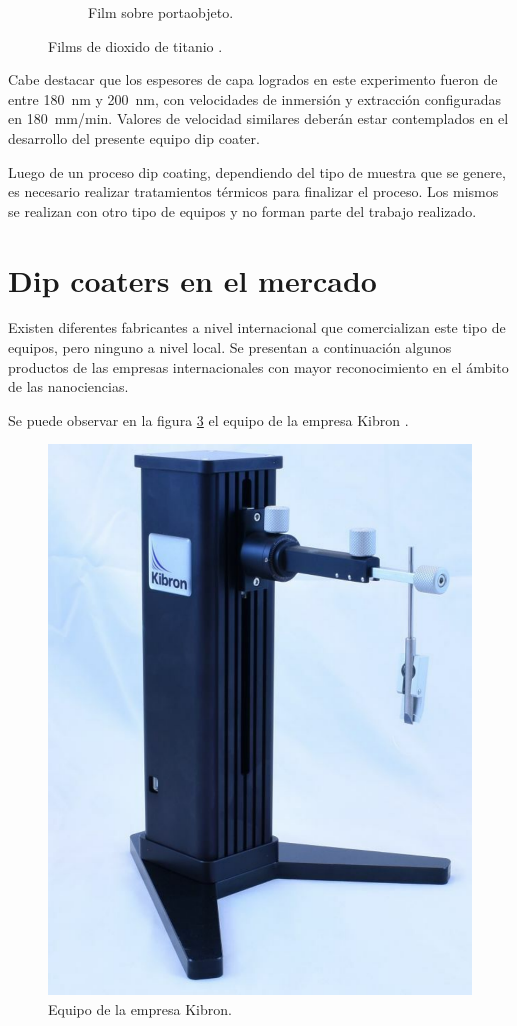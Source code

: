 \begin{figure}[!htpb]
\begin{subfigure}[b]{0.4\textwidth}
         \caption{Film sobre portaobjeto.}
         \label{fig:muestra_"}
     \end{subfigure}
     \hfill
        \caption{Films de dioxido de titanio  \protect\footnotemark.}
        \label{fig:muestras}
\end{figure}



Cabe destacar que los espesores de capa logrados en este experimento fueron de entre \SI{180}{nm} y \SI{200}{nm}, con velocidades de inmersión y extracción configuradas en \SI{180}{mm/min}. Valores de velocidad similares deberán estar contemplados en el desarrollo del presente equipo dip coater.

Luego de un proceso dip coating, dependiendo del tipo de muestra que se genere, es necesario realizar tratamientos térmicos para finalizar el proceso. Los mismos se realizan con otro tipo de equipos y no forman parte del trabajo realizado.
 
\label{sec:dip coating}

\section{Dip coaters en el mercado}
\label{sec:mercado}
Existen diferentes fabricantes a nivel internacional que comercializan este tipo de equipos, pero ninguno a nivel local. Se presentan a continuación algunos productos de las empresas internacionales con mayor reconocimiento en el ámbito de las nanociencias. 

Se puede observar en la figura \ref{fig:dip_kibron} el equipo de la empresa Kibron \citep{2_web_kibron}.

\begin{figure}[htbp]
	\centering
	\includegraphics[width=.25\textwidth]{./Figures/kibron.pdf}
	\caption{Equipo de la empresa Kibron.}
	\label{fig:dip_kibron}
\end{figure}

